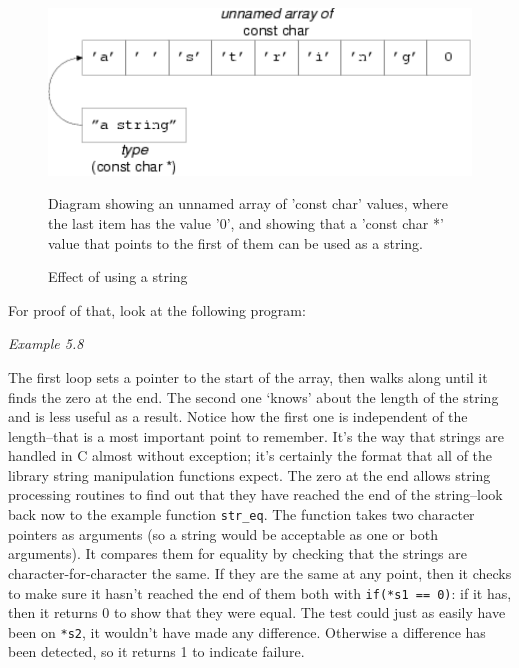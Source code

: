     \begin{figure}[htb]\centering
      \includegraphics[type=pdf,read=.pdf,ext=.pdf,scale=0.9]
      {figure/5.7_string}
      \caption*{Diagram showing an unnamed array of 'const char' values,
        where the            last item has the value '0',
        and showing that a 'const char *'            value
        that points to the first of them can be used as a string.}
      \caption{\label{fig:string}Effect of using a string}
    \end{figure}



   For proof of that, look at the following program:


   \begin{center}\textit{Example 5.8}\end{center}


   The first loop sets a pointer to the start of the array, then walks
    along until it finds the zero at the end. The second one `knows'
    about the length of the string and is less useful as a result. Notice
    how the first one is independent of the length--that is a most
    important point to remember. It's the way that strings are handled in
    C almost without exception; it's certainly the format that all of the
    library string manipulation functions expect. The zero at the end allows
    string processing routines to find out that they have reached the end of
    the string--look back now to the example function
    \texttt{str\_eq}.  The function takes two character pointers as
    arguments (so a string would be acceptable as one or both arguments). It
    compares them for equality by checking that the strings are
    character-for-character the same. If they are the same at any point,
    then it checks to make sure it hasn't reached the end of them both with
    \texttt{if(*s1 == 0)}: if it has, then it returns 0 to show that
    they were equal. The test could just as easily have been on
    \texttt{*s2}, it wouldn't have made any difference.  Otherwise
    a difference has been detected, so it returns 1 to indicate failure.


